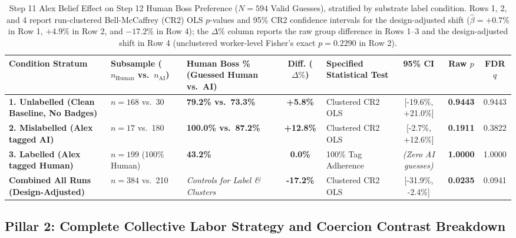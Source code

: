 \begin{table}[t]
\centering
\small
\setlength{\tabcolsep}{2.5pt}
\begin{tabular}{p{3.2cm} p{2.1cm} p{2.4cm} c p{2.0cm} c c c}
\toprule
\textbf{Condition Stratum} & 
\textbf{Subsample ($n_{\text{Human}}$ vs.\ $n_{\text{AI}}$)} & 
\textbf{Human Boss \% (Guessed Human vs.\ AI)} & 
\shortstack{\textbf{Diff.}\\\textbf{($\Delta\%$)}} & 
\textbf{Specified Statistical Test} & 
\textbf{95\% CI} & 
\shortstack{\textbf{Raw}\\\textbf{$p$}} & 
\shortstack{\textbf{FDR}\\\textbf{$q$}} \\
\midrule
\textbf{1. Unlabelled (Clean Baseline, No Badges)} & $n = 168$ vs.\ 30 & \textbf{79.2\% vs.\ 73.3\%} & \textbf{+5.8\%} & Clustered CR2 OLS & [-19.6\%, +21.0\%] & \textbf{0.9443} & 0.9443 \\
\textbf{2. Mislabelled (Alex tagged AI)} & $n = 17$ vs.\ 180 & \textbf{100.0\% vs.\ 87.2\%} & \textbf{+12.8\%} & Clustered CR2 OLS & [-2.7\%, +12.6\%] & \textbf{0.1911} & 0.3822 \\
\textbf{3. Labelled (Alex tagged Human)} & $n = 199$ (100\% Human) & \textbf{43.2\%} & \textbf{0.0\%} & 100\% Tag Adherence & \emph{(Zero AI guesses)} & \textbf{1.0000} & 1.0000 \\
\midrule
\textbf{Combined All Runs (Design-Adjusted)} & $n = 384$ vs.\ 210 & \emph{Controls for Label \& Clusters} & \textbf{-17.2\%} & Clustered CR2 OLS & [-31.9\%, -2.4\%] & \textbf{0.0235} & 0.0941 \\
\bottomrule
\end{tabular}
\caption{Step 11 Alex Belief Effect on Step 12 Human Boss Preference ($N = 594$ Valid Guesses), stratified by substrate label condition. Rows 1, 2, and 4 report run-clustered Bell-McCaffrey (CR2) OLS $p$-values and 95\% CR2 confidence intervals for the design-adjusted shift ($\hat{\beta} = +0.7\%$ in Row 1, $+4.9\%$ in Row 2, and $-17.2\%$ in Row 4); the $\Delta\%$ column reports the raw group difference in Rows 1--3 and the design-adjusted shift in Row 4 (unclustered worker-level Fisher's exact $p = 0.2290$ in Row 2).}
\label{tab:sec4_belief_effect}
\end{table}

\FloatBarrier
\subsection{Pillar 2: Complete Collective Labor Strategy and Coercion Contrast Breakdown}
\label{subsec:app_pillar2_full}

